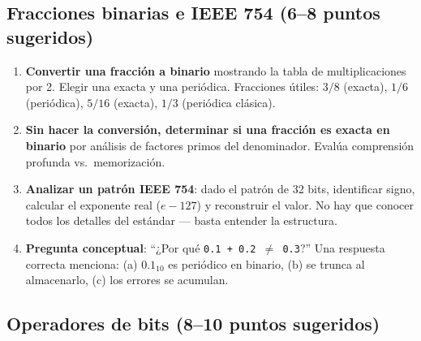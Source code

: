\documentclass[12pt, oneside]{article}
\begin{document}
\subsection{Fracciones binarias e IEEE 754 (6–8 puntos sugeridos)}

\begin{notaprofesor}
  \begin{enumerate}
    \item \textbf{Convertir una fracción a binario} mostrando la tabla de
          multiplicaciones por 2.  Elegir una exacta y una periódica.
          Fracciones útiles: $3/8$ (exacta), $1/6$ (periódica), $5/16$ (exacta),
          $1/3$ (periódica clásica).
    \item \textbf{Sin hacer la conversión, determinar si una fracción es exacta en
          binario} por análisis de factores primos del denominador.
          Evalúa comprensión profunda vs.\ memorización.
    \item \textbf{Analizar un patrón IEEE 754}: dado el patrón de 32 bits,
          identificar signo, calcular el exponente real ($e - 127$) y
          reconstruir el valor.  No hay que conocer todos los detalles del
          estándar — basta entender la estructura.
    \item \textbf{Pregunta conceptual}: ``¿Por qué \texttt{0.1 + 0.2 $\neq$ 0.3}?''
          Una respuesta correcta menciona: (a) $0.1_{10}$ es periódico en binario,
          (b) se trunca al almacenarlo, (c) los errores se acumulan.
  \end{enumerate}
\end{notaprofesor}

\subsection{Operadores de bits (8–10 puntos sugeridos)}
\end{document}
